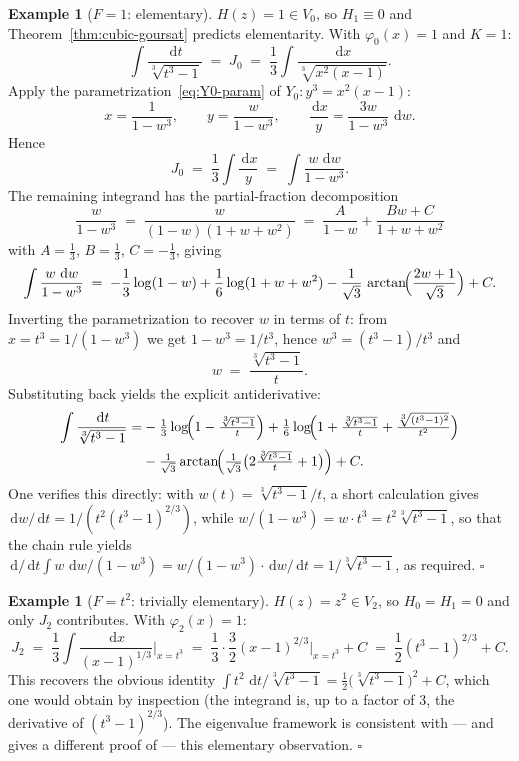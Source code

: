 \documentclass[11pt,a4paper]{article}
\theoremstyle{plain}
\theoremstyle{definition}
\newtheorem{example}[theorem]{Example}
\theoremstyle{remark}
\renewcommand{\d}{\,\mathrm{d}}
\begin{document}
\begin{example}[$F=1$: elementary]\label{ex:F1}
$H(z)=1\in V_0$, so $H_1\equiv 0$ and Theorem~\ref{thm:cubic-goursat} predicts elementarity. With $\varphi_0(x)=1$ and $K=1$:
\[
  \int \frac{\d t}{\sqrt[3]{t^3-1}} \;=\; J_0 \;=\; \frac{1}{3}\int \frac{\d x}{\sqrt[3]{x^2(x-1)}}.
\]
Apply the parametrization~\eqref{eq:Y0-param} of $Y_0\colon y^3=x^2(x-1)$:
\[
  x = \frac{1}{1-w^3},\qquad y = \frac{w}{1-w^3},\qquad \frac{\d x}{y} = \frac{3w}{1-w^3}\,\d w.
\]
Hence
\[
  J_0 \;=\; \frac{1}{3}\int \frac{\d x}{y} \;=\; \int \frac{w\,\d w}{1-w^3}.
\]
The remaining integrand has the partial-fraction decomposition
\[
  \frac{w}{1-w^3} \;=\; \frac{w}{(1-w)(1+w+w^2)} \;=\; \frac{A}{1-w} + \frac{Bw+C}{1+w+w^2}
\]
with $A=\tfrac{1}{3}$, $B=\tfrac{1}{3}$, $C=-\tfrac{1}{3}$, giving
\[
  \int \frac{w\,\d w}{1-w^3} \;=\; -\frac{1}{3}\log(1-w) + \frac{1}{6}\log(1+w+w^2) - \frac{1}{\sqrt{3}}\,\arctan\!\Bigl(\frac{2w+1}{\sqrt{3}}\Bigr) + C.
\]
Inverting the parametrization to recover $w$ in terms of $t$: from $x=t^3=1/(1-w^3)$ we get $1-w^3=1/t^3$, hence $w^3 = (t^3-1)/t^3$ and
\[
  w \;=\; \frac{\sqrt[3]{t^3-1}}{t}.
\]
Substituting back yields the explicit antiderivative:
\[
\begin{aligned}
  \int \frac{\d t}{\sqrt[3]{t^3-1}}
   = &-\tfrac{1}{3}\log\!\Bigl(1-\tfrac{\sqrt[3]{t^3-1}}{t}\Bigr)
     + \tfrac{1}{6}\log\!\Bigl(1+\tfrac{\sqrt[3]{t^3-1}}{t} + \tfrac{\sqrt[3]{(t^3-1)^2}}{t^2}\Bigr) \\
   & - \tfrac{1}{\sqrt{3}}\arctan\!\Bigl(\tfrac{1}{\sqrt{3}}\bigl(2\tfrac{\sqrt[3]{t^3-1}}{t} + 1\bigr)\Bigr) + C.
\end{aligned}
\]
One verifies this directly: with $w(t) = \sqrt[3]{t^3-1}/t$, a short calculation gives $\d w/\d t = 1/(t^2(t^3-1)^{2/3})$, while $w/(1-w^3) = w\cdot t^3 = t^2 \sqrt[3]{t^3-1}$, so that the chain rule yields $\d/\d t \int w\,\d w/(1-w^3) = w/(1-w^3)\cdot \d w/\d t = 1/\sqrt[3]{t^3-1}$, as required. \hfill$\square$
\end{example}

\begin{example}[$F=t^2$: trivially elementary]\label{ex:Ft2}
$H(z)=z^2\in V_2$, so $H_0=H_1=0$ and only $J_2$ contributes. With $\varphi_2(x)=1$:
\[
  J_2 \;=\; \frac{1}{3}\int \frac{\d x}{(x-1)^{1/3}}\bigg|_{x=t^3} \;=\; \frac{1}{3}\cdot\frac{3}{2}(x-1)^{2/3}\bigg|_{x=t^3} + C \;=\; \frac{1}{2}(t^3-1)^{2/3} + C.
\]
This recovers the obvious identity $\int t^2\,\d t/\sqrt[3]{t^3-1} = \tfrac{1}{2}\bigl(\sqrt[3]{t^3-1}\bigr)^2 + C$, which one would obtain by inspection (the integrand is, up to a factor of $3$, the derivative of $(t^3-1)^{2/3}$). The eigenvalue framework is consistent with --- and gives a different proof of --- this elementary observation. \hfill$\square$
\end{example}
\end{document}
